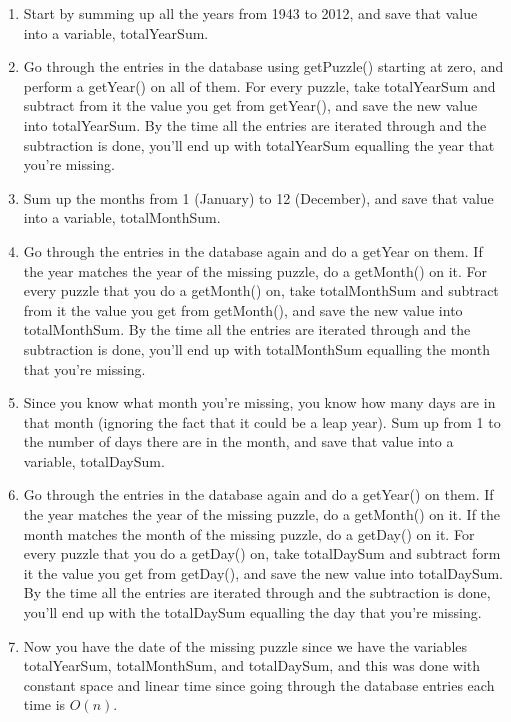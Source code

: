 \documentclass{article}
\begin{document}
\begin{enumerate}

\item Start by summing up all the years from 1943 to 2012, and save that value into a variable, totalYearSum.

\item Go through the entries in the database using getPuzzle() starting at zero, and perform
a getYear() on all of them.  For every puzzle, take totalYearSum and subtract from it the value you get from getYear(), and save the new value into totalYearSum. By the time all the entries are iterated through and the subtraction is done, you'll end up with totalYearSum equalling the year that you're missing.

\item Sum up the months from 1 (January) to 12 (December), and save that value into a variable, totalMonthSum.

\item Go through the entries in the database again and do a getYear on them.  If the year matches the 
year of the missing puzzle, do a getMonth() on it. For every puzzle that you do a getMonth() on, take totalMonthSum and subtract from it the value you get from getMonth(), and save the new value into totalMonthSum. By the time all the entries are iterated through and the subtraction is done, you'll end up with totalMonthSum equalling the month that you're missing.

\item Since you know what month you're missing, you know how many days are in that month (ignoring the fact that it could be a leap year). Sum up from 1 to the number of days there are in the month, and save that value into a variable, totalDaySum.

\item Go through the entries in the database again and do a getYear() on them.  If the year matches the 
year of the missing puzzle, do a getMonth() on it.  If the month matches the month of the missing puzzle, do a getDay() on it. For every puzzle that you do a getDay() on, take totalDaySum and subtract form it the value you get from getDay(), and save the new value into totalDaySum. By the time all the entries are iterated through and the subtraction is done, you'll end up with the totalDaySum equalling the day that you're missing.

\item Now you have the date of the missing puzzle since we have the variables totalYearSum, totalMonthSum, and totalDaySum, and this was done with constant space and linear time since going through the database entries each time is $O(n)$.

\end{enumerate}
\end{document}
